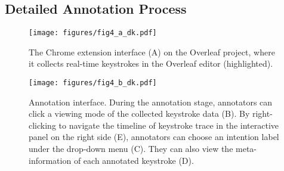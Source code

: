 \subsection{Detailed Annotation Process}


    

\begin{figure}[t!]
    \centering
    {\texttt{[image: figures/fig4\_a\_dk.pdf]}}
    \caption{The Chrome extension interface (A) on the Overleaf project, where it collects real-time keystrokes in the Overleaf editor (highlighted). \vspace{-4mm}}
    \label{fig:chrome-extension}
\end{figure}

\begin{figure}[ht!]
    \centering
    {\texttt{[image: figures/fig4\_b\_dk.pdf]}}
    \caption{Annotation interface. During the annotation stage, annotators can click a viewing mode of the collected keystroke data (B). By right-clicking to navigate the timeline of keystroke trace in the interactive panel on the right side (E), annotators can choose an intention label under the drop-down menu (C). They can also view the meta-information of each annotated keystroke (D). }
    \label{fig:annotation-interface}
\end{figure}

